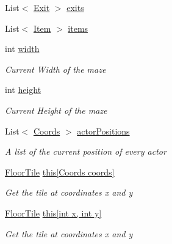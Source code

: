 \begin{DoxyCompactItemize}
\item 
List$<$ \hyperlink{class_gruppe22_1_1_backend_1_1_exit}{Exit} $>$ \hyperlink{class_gruppe22_1_1_backend_1_1_map_a0dc104d0e3f5896a272e4ed47dd79378}{exits}
\item 
List$<$ \hyperlink{class_gruppe22_1_1_backend_1_1_item}{Item} $>$ \hyperlink{class_gruppe22_1_1_backend_1_1_map_a91a89a011cd659affbbb00ea924211ca}{items}
\item 
int \hyperlink{class_gruppe22_1_1_backend_1_1_map_ae185d7c51dd35311f6065044e603e81f}{width}
\begin{DoxyCompactList}\small\item\em Current Width of the maze \end{DoxyCompactList}\item 
int \hyperlink{class_gruppe22_1_1_backend_1_1_map_aef59f2269d64d10b35acbabb6461fa55}{height}
\begin{DoxyCompactList}\small\item\em Current Height of the maze \end{DoxyCompactList}\item 
List$<$ \hyperlink{class_gruppe22_1_1_backend_1_1_coords}{Coords} $>$ \hyperlink{class_gruppe22_1_1_backend_1_1_map_a186af3927e65a77740f619513dd2c60a}{actor\-Positions}
\begin{DoxyCompactList}\small\item\em A list of the current position of every actor \end{DoxyCompactList}\item 
\hyperlink{class_gruppe22_1_1_backend_1_1_floor_tile}{Floor\-Tile} \hyperlink{class_gruppe22_1_1_backend_1_1_map_ac19e7d998d1c4befe3f1129939fd6b74}{this\mbox{[}\-Coords coords\mbox{]}}
\begin{DoxyCompactList}\small\item\em Get the tile at coordinates x and y \end{DoxyCompactList}\item 
\hyperlink{class_gruppe22_1_1_backend_1_1_floor_tile}{Floor\-Tile} \hyperlink{class_gruppe22_1_1_backend_1_1_map_a51c56c902b3c7d2ee1e324b59ee89f8a}{this\mbox{[}int x, int y\mbox{]}}
\begin{DoxyCompactList}\small\item\em Get the tile at coordinates x and y \end{DoxyCompactList}\end{DoxyCompactItemize}


